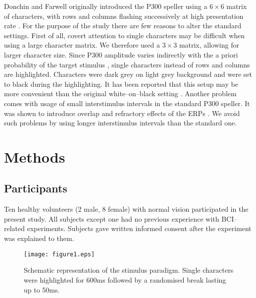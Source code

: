 \documentclass[a4paper,twocolumn]{article}
\begin{document}
Donchin and Farwell originally introduced the P300 speller using a $6\times6$ matrix of characters, with rows and columns flashing successively at high presentation rate \cite{Farwell1988}. For the purpose of the study there are few reasons to alter the standard settings. First of all, covert attention to single characters may be difficult when using a large character matrix. We therefore used a $3\times3$ matrix, allowing for larger character size. Since P300 amplitude varies indirectly with the a priori probability of the target stimulus \cite{Duncan-JohnsonDonchin1977}, single characters instead of rows and columns are highlighted. Characters were dark grey on light grey background and were set to black during the highlighting. It has been reported that this setup may be more convenient than the original white--on--black setting \cite{Salvaris2009}. Another problem comes with usage of small interstimulus intervals in the standard P300 speller. It was shown to introduce overlap and refractory effects of the ERPs \cite{MartensEtAl2009}. We avoid such problems by using longer interstimulus intervals than the standard one.

\section*{Methods}
\subsection*{Participants}
Ten healthy volunteers (2 male, 8 female) with normal vision participated in the present study. All subjects except one had no previous experience with BCI--related experiments. Subjects gave written informed consent after the experiment was explained to them. \begin{figure}
\centering
\texttt{[image: figure1.eps]}
\caption{{Schematic representation of the stimulus paradigm.} Single characters were highlighted for 600ms followed by a randomised break lasting up to 50ms.}
\label{fig:stimulus_schema}
\end{figure}
\end{document}
